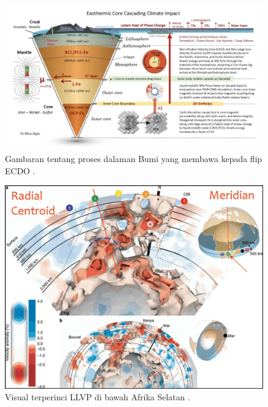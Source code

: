 \documentclass[10pt,twocolumn,letterpaper]{article}
\begin{document}
\begin{figure}[t]
\begin{center}
\includegraphics[width=1\textwidth]{layers.jpg}
\end{center}
   \caption{Gambaran tentang proses dalaman Bumi yang membawa kepada flip ECDO \cite{129}.}
\label{fig:11}
\end{figure}


\begin{figure}[t]
\begin{center}
   \includegraphics[width=1\linewidth]{llvp.jpg}
\end{center}
   \caption{Visual terperinci LLVP di bawah Afrika Selatan \cite{28}.}
\label{fig:12}
\label{fig:onecol}
\end{figure}
\end{document}
